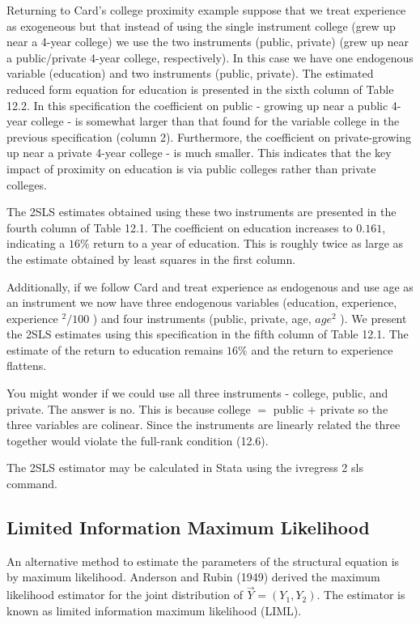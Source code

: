 \documentclass[10pt]{article}
\begin{document}
Returning to Card's college proximity example suppose that we treat experience as exogeneous but that instead of using the single instrument college (grew up near a 4-year college) we use the two instruments (public, private) (grew up near a public/private 4-year college, respectively). In this case we have one endogenous variable (education) and two instruments (public, private). The estimated reduced form equation for education is presented in the sixth column of Table 12.2. In this specification the coefficient on public - growing up near a public 4-year college - is somewhat larger than that found for the variable college in the previous specification (column 2). Furthermore, the coefficient on private-growing up near a private 4-year college - is much smaller. This indicates that the key impact of proximity on education is via public colleges rather than private colleges.

The 2SLS estimates obtained using these two instruments are presented in the fourth column of Table 12.1. The coefficient on education increases to $0.161$, indicating a $16 \%$ return to a year of education. This is roughly twice as large as the estimate obtained by least squares in the first column.

Additionally, if we follow Card and treat experience as endogenous and use age as an instrument we now have three endogenous variables (education, experience, experience ${ }^{2} / 100$ ) and four instruments (public, private, age, $a g e^{2}$ ). We present the 2SLS estimates using this specification in the fifth column of Table 12.1. The estimate of the return to education remains $16 \%$ and the return to experience flattens.

You might wonder if we could use all three instruments - college, public, and private. The answer is no. This is because college $=$ public $+$ private so the three variables are colinear. Since the instruments are linearly related the three together would violate the full-rank condition (12.6).

The 2SLS estimator may be calculated in Stata using the ivregress 2 sls command.

\subsection{Limited Information Maximum Likelihood}
An alternative method to estimate the parameters of the structural equation is by maximum likelihood. Anderson and Rubin (1949) derived the maximum likelihood estimator for the joint distribution of $\vec{Y}=\left(Y_{1}, Y_{2}\right)$. The estimator is known as limited information maximum likelihood (LIML).
\end{document}
